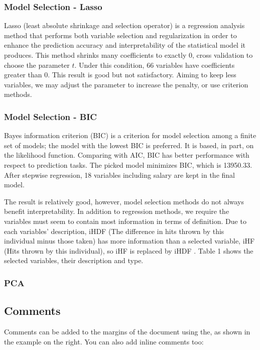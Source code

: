 \subsubsection{Model Selection - Lasso}
Lasso (least absolute shrinkage and selection operator) is a regression analysis method that performs both variable selection and regularization in order to enhance the prediction accuracy and interpretability of the statistical model it produces. This method shrinks many coefficients to exactly 0, cross validation to choose the parameter $t$. Under this condition, 66 variables have coefficients greater than 0. This result is good but not satisfactory. Aiming to keep less variables, we may adjust the parameter to increase the penalty, or use criterion methods.

\subsubsection{Model Selection - BIC}
Bayes information criterion (BIC) is a criterion for model selection among a finite set of models; the model with the lowest BIC is preferred. It is based, in part, on the likelihood function. Comparing with AIC, BIC has better performance with respect to prediction tasks. The picked model minimizes BIC, which is 13950.33. After stepwise regression, 18 variables including salary are kept in the final model. 

The result is relatively good, however, model selection methods do not always benefit interpretability. In addition to regression methods, we require the variables must seem to contain most information in terms of definition. Due to each variables' description, iHDF (The difference in hits thrown by this individual minus those taken) has more information than a selected variable, iHF (Hits thrown by this individual), so iHF is replaced by iHDF . Table 1 shows the selected variables, their description and type.

\subsubsection{PCA}

\subsection{Comments}

Comments can be added to the margins of the document using the, as shown in the example on the right. You can also add inline comments too:

